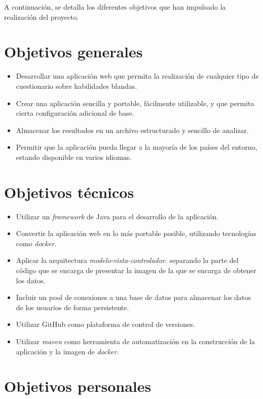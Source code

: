 
A continuación, se detalla los diferentes objetivos que han impulsado la realización del proyecto.

\section{Objetivos generales}

\begin{itemize}
	\item Desarrollar una aplicación web que permita la realización de cualquier tipo de cuestionario sobre habilidades blandas.
	\item Crear una aplicación sencilla y portable, fácilmente utilizable, y que permita cierta configuración adicional de base.
	\item Almacenar los resultados en un archivo estructurado y sencillo de analizar.
	\item Permitir que la aplicación pueda llegar a la mayoría de los países del entorno, estando disponible en varios idiomas.
\end{itemize}



\section{Objetivos técnicos}


\begin{itemize}
	\item Utilizar un \textit{framework} de Java para el desarrollo de la aplicación.
	\item Convertir la aplicación web en lo más portable posible, utilizando tecnologías como \textit{docker}.
	\item Aplicar la arquitectura \textit{modelo-vista-controlador}. separando la parte del código que se encarga de presentar la imagen de la que se encarga de obtener los datos.
	\item Incluir un pool de conexiones a una base de datos para almacenar los datos de los usuarios de forma persistente.
	\item Utilizar GitHub como plataforma de control de versiones.
	\item Utilizar \textit{maven} como herramienta de automatización en la construcción de la aplicación y la imagen de \textit{docker}.
\end{itemize}

\section{Objetivos personales}

